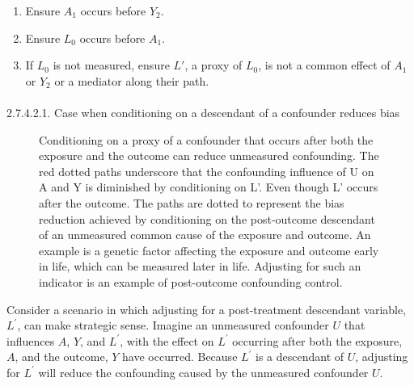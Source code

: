 \documentclass[
  singlecolumn]{article}
\makeatletter
\let\oldparagraph\paragraph
\renewcommand{\paragraph}{
    \@ifstar
      \xxxParagraphStar
      \xxxParagraphNoStar
  }
\newcommand{\xxxParagraphStar}[1]{\oldparagraph*{#1}\mbox{}}
\newcommand{\xxxParagraphNoStar}[1]{\oldparagraph{#1}\mbox{}}
\providecommand{\tightlist}{%
  \setlength{\itemsep}{0pt}\setlength{\parskip}{0pt}}\usepackage{longtable,booktabs,array}
\makeatother
\begin{document}
\begin{enumerate}
\def\labelenumi{\arabic{enumi}.}
\tightlist
\item
  Ensure \(A_1\) occurs before \(Y_2\).
\item
  Ensure \(L_0\) occurs before \(A_1\).
\item
  If \(L_0\) is not measured, ensure \(L'\), a proxy of \(L_0\), is not
  a common effect of \(A_1\) or \(Y_2\) or a mediator along their path.
\end{enumerate}

\paragraph{2.7.4.2.1. Case when conditioning on a descendant of a
confounder reduces
bias}\label{case-when-conditioning-on-a-descendant-of-a-confounder-reduces-bias}

\begin{figure}


\caption{\label{fig-dag-descendant-solution-2}Conditioning on a proxy of
a confounder that occurs after both the exposure and the outcome can
reduce unmeasured confounding. The red dotted paths underscore that the
confounding influence of U on A and Y is diminished by conditioning on
L'. Even though L' occurs after the outcome. The paths are dotted to
represent the bias reduction achieved by conditioning on the
post-outcome descendant of an unmeasured common cause of the exposure
and outcome. An example is a genetic factor affecting the exposure and
outcome early in life, which can be measured later in life. Adjusting
for such an indicator is an example of post-outcome confounding
control.}

\end{figure}%

Consider a scenario in which adjusting for a post-treatment descendant
variable, \(L^\prime\), can make strategic sense. Imagine an unmeasured
confounder \(U\) that influences \(A\), \(Y\), and \(L^\prime\), with
the effect on \(L^\prime\) occurring after both the exposure, \(A\), and
the outcome, \(Y\) have occurred. Because \(L^\prime\) is a descendant
of \(U\), adjusting for \(L^\prime\) will reduce the confounding caused
by the unmeasured confounder \(U\).
\end{document}
